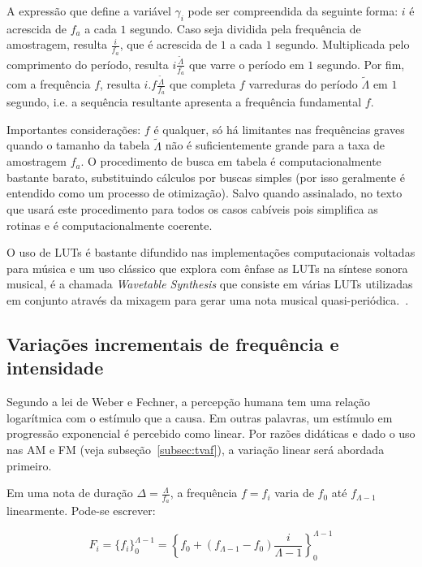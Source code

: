  A expressão que define a variável $\gamma_i$ pode ser compreendida da
 seguinte forma: $i$ é acrescida de $f_a$ a cada $1$ segundo.
 Caso seja dividida pela frequência de amostragem, resulta $\frac{i}{f_a}$,
que é acrescida de $1$ a cada $1$ segundo. Multiplicada pelo comprimento do período, resulta $i \frac{\widetilde{\Lambda}}{f_a}$
 que varre o 
  período em $1$ segundo. Por fim,
 com a frequência $f$, resulta $i . f \frac{\widetilde{\Lambda}}{f_a}$
 que completa $f$ varreduras do período  $\widetilde{\Lambda}$ em $1$ segundo, i.e. a sequência
 resultante apresenta a frequência fundamental $f$.

Importantes considerações: $f$ é qualquer, só há limitantes nas frequências
graves quando o tamanho da tabela $\widetilde{\Lambda}$ não é suficientemente grande para a taxa de amostragem
$f_a$. O procedimento de busca em tabela
é computacionalmente bastante barato, substituindo cálculos por buscas simples (por isso geralmente
é entendido como um processo de otimização). Salvo quando assinalado,
no texto que usará este procedimento para todos os casos cabíveis pois
simplifica as rotinas e é computacionalmente coerente.

O uso de LUTs é bastante difundido nas implementações computacionais
voltadas para música e um uso clássico que explora com ênfase
as LUTs na síntese sonora musical, é a  chamada 
\emph{Wavetable Synthesis} que consiste em várias LUTs utilizadas em 
conjunto através da mixagem para gerar uma nota musical quasi-periódica.~\cite{Cook,Wavetable}.


\subsection{Variações incrementais de frequência e intensidade}\label{subsec:vars}

Segundo a lei de Weber e Fechner, a percepção humana tem uma relação logarítmica com
o estímulo que a causa.\cite{Weber-Fechner} Em outras palavras, um estímulo em progressão exponencial
é percebido como linear.
Por razões didáticas e dado o uso nas AM e FM (veja subseção~\ref{subsec:tvaf}), a variação linear será abordada primeiro.

Em uma nota de duração $\Delta = \frac{\Lambda}{f_a}$, a frequência $f=f_i$ varia de $f_0$ até $f_{\Lambda -1}$
linearmente. Pode-se escrever:

\begin{equation}\label{freqLinear}
F_i=\{f_i\}_0^{\Lambda-1}=\left\{f_0 + (f_{\Lambda-1}-f_0)\frac{i}{\Lambda-1} \right\}_0^{\Lambda-1}
\end{equation}

